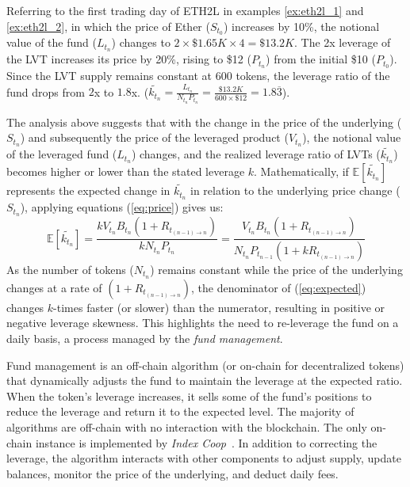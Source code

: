 \begin{example}\label{ex:eth2l_3}
	Referring to the first trading day of ETH2L in examples \ref{ex:eth2l_1} and \ref{ex:eth2l_2}, in which the price of Ether ($S_{t_{0}}$) increases by 10\%, the notional value of the fund ($L_{t_{n}}$) changes to $2\times{\$1.65K}\times{4}=\$13.2K$. The 2x leverage of the LVT increases its price by 20\%, rising to \$12 ($P_{t_{n}}$) from the initial \$10 ($P_{t_{0}}$). Since the LVT supply remains constant at 600 tokens, the leverage ratio of the fund drops from $2$x to $1.8$x. ($\tilde{k_{t_{n}}}=\frac{L_{t_{n}}}{N_{t_{n}}P_{t_{n}}}=\frac{\$13.2K}{600\times{\$12}}=1.8\overline{3}$).
\end{example}
The analysis above suggests that with the change in the price of the underlying ($S_{t_{n}}$) and subsequently the price of the leveraged product ($V_{t_{n}}$), the notional value of the leveraged fund ($L_{t_{n}}$) changes, and the realized leverage ratio of LVTs ($\tilde{k_{t_{n}}}$) becomes higher or lower than the stated leverage $k$. Mathematically, if $\mathbb{E}[\tilde{k_{t_{n}}}]$ represents the expected change in $\tilde{k_{t_{n}}}$ in relation to the underlying price change ($S_{t_{n}}$), applying equations (\ref{eq:price}) gives us:
\begin{equation}
	\mathbb{E}[\tilde{k_{t_{n}}}]=\frac{kV_{t_{n}}B_{t_{n}}(1+R_{t_{(n-1)\to n}})}{kN_{t_{n}}P_{t_{n}}}=\frac{V_{t_{n}}B_{t_{n}}(1+R_{t_{(n-1)\to n}})}{N_{t_{n}}P_{t_{n-1}}(1+kR_{t_{(n-1)\to n}})}\label{eq:expected}
\end{equation}
As the number of tokens ($N_{t_{n}}$) remains constant while the price of the underlying changes at a rate of $(1+R_{t_{(n-1)\to n}})$, the denominator of (\ref{eq:expected}) changes $k$-times faster (or slower) than the numerator, resulting in positive or negative leverage skewness. This highlights the need to re-leverage the fund on a daily basis, a process managed by the \textsl{fund management}.

Fund management is an off-chain algorithm (or on-chain for decentralized tokens) that dynamically adjusts the fund to maintain the leverage at the expected ratio. When the token's leverage increases, it sells some of the fund's positions to reduce the leverage and return it to the expected level. The majority of algorithms are off-chain with no interaction with the blockchain. The only on-chain instance is implemented by \textsl{Index Coop}~\cite{IndexCoop_FLI_01}. In addition to correcting the leverage, the algorithm interacts with other components to adjust supply, update balances, monitor the price of the underlying, and deduct daily fees.

